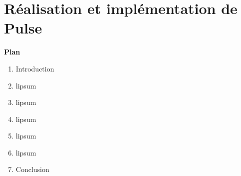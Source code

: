 ﻿\chapter{Réalisation et implémentation de Pulse} 
\label{chap:realisation_implantation}
\thispagestyle{noheaderpagenum}
{
    \setlength{\parindent}{0pt}
    \Large\textbf{Plan}
    \vspace{0.5cm}
    
    \renewcommand{\labelenumi}{\textbf{\arabic{enumi}.}}
    
    \begin{enumerate}[leftmargin=1.5cm, labelsep=0.5cm, itemsep=0.3cm]
        \item Introduction \dotfill \pageref{sec:c3_intro}
        \item lipsum \dotfill \pageref{sec:c3_azure}
        \item lipsum \dotfill \pageref{sec:c3_persistence}
        \item lipsum \dotfill \pageref{sec:c3_app_dev}
        \item lipsum \dotfill \pageref{sec:c3_data_evm}
        \item lipsum \dotfill \pageref{sec:c3_cognitive}
        \item Conclusion \dotfill \pageref{sec:c3_concl}
    \end{enumerate}
}
\clearpage
\thispagestyle{fancy}
